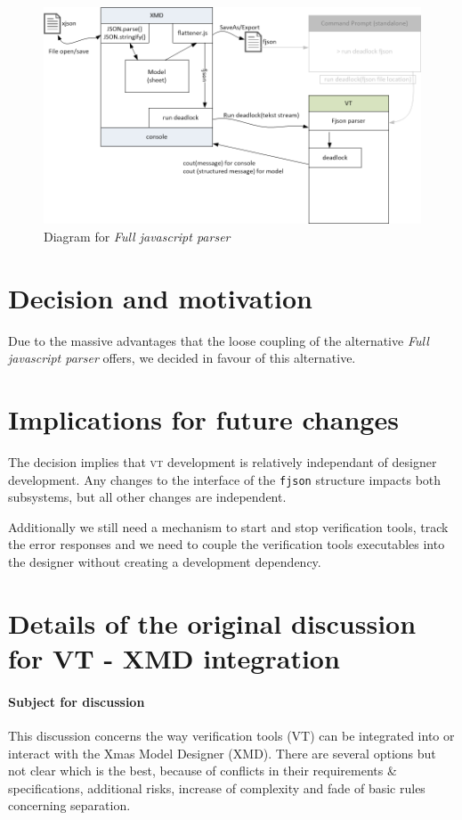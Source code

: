 \documentclass[a4paper,11pt,final]{article}
\newcommand{\w}[1]{\texttt{#1}\xspace}
\newcommand{\vt}{\textsc{vt}\xspace}%
\begin{document}
\begin{figure}[here]
\includegraphics[width=1.0\textwidth]{xmd2vt}
\caption{Diagram for \textit{Full javascript parser}}
\label{fig:fulljavascriptparser}
\end{figure}


\section{Decision and motivation}

Due to the massive advantages that the loose coupling of the alternative 
\textit{Full javascript parser} offers, we decided in favour of this alternative. 

\section{Implications for future changes}

The decision implies that \vt development is relatively independant of 
designer development. Any changes to the interface of the \w{fjson} structure
impacts both subsystems, but all other changes are independent.

Additionally we still need a mechanism to start and stop verification tools, track
the error responses and we need to couple the verification tools executables into
the designer without creating a development dependency. 


\section{Details of the original discussion for VT - XMD integration}

\paragraph{Subject for discussion}
This discussion concerns the way verification tools (VT) can be integrated
into or interact with the Xmas Model Designer (XMD). There are several
options but not clear which is the best, because of conflicts in their
requirements \& specifications, additional risks, increase of complexity
and fade of basic rules concerning separation. 
\end{document}
